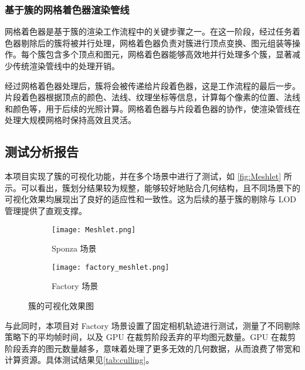 \subsubsection{基于簇的网格着色器渲染管线}

网格着色器是基于簇的渲染工作流程中的关键步骤之一。在这一阶段，经过任务着色器剔除后的簇将被并行处理，网格着色器负责对簇进行顶点变换、图元组装等操作。每个簇包含多个顶点和图元，网格着色器能够高效地并行处理多个簇，显著减少传统渲染管线中的处理开销\cite{Santerre2020}。

经过网格着色器处理后，簇将会被传递给片段着色器，这是工作流程的最后一步。片段着色器根据顶点的颜色、法线、纹理坐标等信息，计算每个像素的位置、法线和颜色等，用于后续的光照计算。网格着色器与片段着色器的协作，使渲染管线在处理大规模网格时保持高效且灵活。

\subsection{测试分析报告}

本项目实现了簇的可视化功能，并在多个场景中进行了测试，如 \autoref{fig:Meshlet} 所示。可以看出，簇划分结果较为规整，能够较好地贴合几何结构，且不同场景下的可视化效果均展现出了良好的适应性和一致性。这为后续的基于簇的剔除与 LOD 管理提供了直观支撑。


\begin{figure*}[htbp]
    \centering

    \begin{subfigure}[b]{0.48\linewidth}
        \centering
        \texttt{[image: Meshlet.png]}
        \caption{Sponza 场景}
    \end{subfigure}
    \hfill
    \begin{subfigure}[b]{0.48\linewidth}
        \centering
        \texttt{[image: factory\_meshlet.png]}
        \caption{Factory 场景}
    \end{subfigure}

    \caption{簇的可视化效果图}
    \vspace{-0.2cm}
    \label{fig:Meshlet}
\end{figure*}

与此同时，本项目对 Factory 场景设置了固定相机轨迹进行测试，测量了不同剔除策略下的平均帧时间，以及 GPU 在裁剪阶段丢弃的平均图元数量。GPU 在裁剪阶段丢弃的图元数量越多，意味着处理了更多无效的几何数据，从而浪费了带宽和计算资源。具体测试结果见\autoref{tab:culling}。

